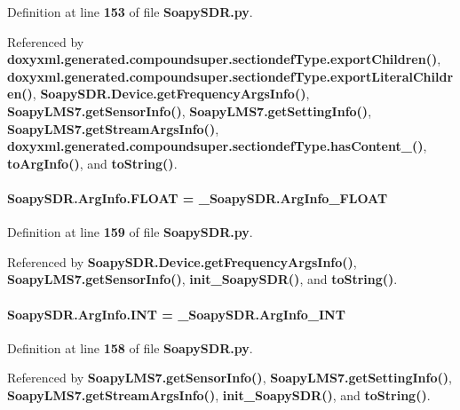 Definition at line {\bf 153} of file {\bf Soapy\+S\+D\+R.\+py}.



Referenced by {\bf doxyxml.\+generated.\+compoundsuper.\+sectiondef\+Type.\+export\+Children()}, {\bf doxyxml.\+generated.\+compoundsuper.\+sectiondef\+Type.\+export\+Literal\+Children()}, {\bf Soapy\+S\+D\+R.\+Device.\+get\+Frequency\+Args\+Info()}, {\bf Soapy\+L\+M\+S7.\+get\+Sensor\+Info()}, {\bf Soapy\+L\+M\+S7.\+get\+Setting\+Info()}, {\bf Soapy\+L\+M\+S7.\+get\+Stream\+Args\+Info()}, {\bf doxyxml.\+generated.\+compoundsuper.\+sectiondef\+Type.\+has\+Content\+\_\+()}, {\bf to\+Arg\+Info()}, and {\bf to\+String()}.

\paragraph[{F\+L\+O\+AT}]{\setlength{\rightskip}{0pt plus 5cm}Soapy\+S\+D\+R.\+Arg\+Info.\+F\+L\+O\+AT = \+\_\+\+Soapy\+S\+D\+R.\+Arg\+Info\+\_\+\+F\+L\+O\+AT\hspace{0.3cm}{\ttfamily [static]}}\label{classSoapySDR_1_1ArgInfo_ab5674bea6727e64ca95cc14bdcda989e}


Definition at line {\bf 159} of file {\bf Soapy\+S\+D\+R.\+py}.



Referenced by {\bf Soapy\+S\+D\+R.\+Device.\+get\+Frequency\+Args\+Info()}, {\bf Soapy\+L\+M\+S7.\+get\+Sensor\+Info()}, {\bf init\+\_\+\+Soapy\+S\+D\+R()}, and {\bf to\+String()}.

\paragraph[{I\+NT}]{\setlength{\rightskip}{0pt plus 5cm}Soapy\+S\+D\+R.\+Arg\+Info.\+I\+NT = \+\_\+\+Soapy\+S\+D\+R.\+Arg\+Info\+\_\+\+I\+NT\hspace{0.3cm}{\ttfamily [static]}}\label{classSoapySDR_1_1ArgInfo_a24f796e08b804674d2847d0027a798dc}


Definition at line {\bf 158} of file {\bf Soapy\+S\+D\+R.\+py}.



Referenced by {\bf Soapy\+L\+M\+S7.\+get\+Sensor\+Info()}, {\bf Soapy\+L\+M\+S7.\+get\+Setting\+Info()}, {\bf Soapy\+L\+M\+S7.\+get\+Stream\+Args\+Info()}, {\bf init\+\_\+\+Soapy\+S\+D\+R()}, and {\bf to\+String()}.

